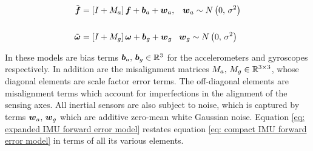 \begin{align} \label{eq: compact IMU forward error model}
	\tilde{\boldsymbol{f}} &= \left[I + M_a\right] \boldsymbol{f} + \boldsymbol{b}_a + \boldsymbol{w}_a, \,\,\,\,\, \boldsymbol{w}_a \sim N\left(0,\,\sigma^2\right) \notag\\
	\\
	\tilde{\boldsymbol{\omega}} &= \left[I + M_g\right] \boldsymbol{\omega} + \boldsymbol{b}_g + \boldsymbol{w}_g \,\,\,\,\, \boldsymbol{w}_g \sim N\left(0,\,\sigma^2\right) \notag
\end{align}

In these models are bias terms $\boldsymbol{b}_a, \, \boldsymbol{b}_g \in \mathbb{R}^3$ for the accelerometers and gyroscopes respectively. In addition are the misalignment matrices $M_a, \, M_g \in \mathbb{R}^{3 \times 3}$, whose diagonal elements are scale factor error terms. The off-diagonal elements are misalignment terms which account for imperfections in the alignment of the sensing axes. All inertial sensors are also subject to noise, which is captured by terms $\boldsymbol{w}_a,\,\boldsymbol{w}_g$ which are additive zero-mean white Gaussian noise. Equation \ref{eq: expanded IMU forward error model} restates equation \ref{eq: compact IMU forward error model} in terms of all its various elements.

